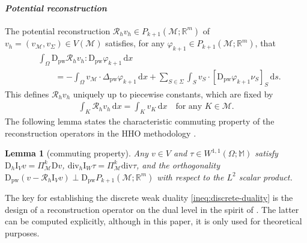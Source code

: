 \documentclass[a4paper]{amsart}
\numberwithin{equation}{section}
\newcommand{\R}{\mathbb{R}}
\renewcommand{\d}[1]{\,\mathrm{d}#1}
\renewcommand{\div}{\mathrm{div}}
\newcommand{\I}{\mathrm{I}}
\newcommand{\Mcal}{\mathcal{M}}
\newcommand{\pw}{\mathrm{pw}}
\newcommand{\D}{\mathrm{D}}
\newcommand{\M}{\mathbb{M}}
\newtheorem{lemma}[theorem]{Lemma}
\theoremstyle{remark}
\begin{document}
\paragraph{\emph{Potential reconstruction}}
The potential reconstruction $\mathcal{R}_h v_h \in P_{k+1}(\Mcal;\R^m)$ of $v_h = (v_\Mcal, v_\Sigma) \in V(\Mcal)$ satisfies, for any $\varphi_{k+1} \in P_{k+1}(\Mcal; \R^m)$, that
\begin{align}\label{def:pot-rec-1}
	&\int_\Omega \D_\pw \mathcal{R}_h v_h : \D_\pw \varphi_{k+1} \d{x}\nonumber\\
	&\qquad = - \int_\Omega v_\Mcal \cdot \Delta_\pw \varphi_{k+1} \d{x} + \sum_{S \in \Sigma} \int_S v_S \cdot [\D_\pw \varphi_{k+1} \nu_S]_S \d{s}.
\end{align}
This defines $\mathcal{R}_h v_h$ uniquely up to piecewise constants, which are fixed by
\begin{align}\label{def:pot-rec-2}
	\int_K \mathcal{R}_h v_h \d{x} = \int_K v_K \d{x} \quad\text{for any } K \in \Mcal.
\end{align}
The following lemma states the characteristic commuting property of the reconstruction operators in the HHO methodology \cite{DiPietroErnLemaire2014,DiPietroErn2015,DiPietroDroniou2020}.
\begin{lemma}[commuting property]\label{lem:commuting-property}
	Any $v \in V$ and $\tau \in W^{1,1}(\Omega;\M)$ satisfy $\D_h \I_{V} v = \Pi_\Mcal^k \D v$, $\div_h \I_W \tau = \Pi_\Mcal^k \div \tau$, and the orthogonality $\D_\pw(v - \mathcal{R}_h \I_V v) \perp \D_\pw P_{k+1}(\Mcal;\R^m)$ with respect to the $L^2$ scalar product.
\end{lemma}
The key for establishing the discrete weak duality \eqref{ineq:discrete-duality} is the design of a reconstruction operator on the dual level in the spirit of \cite{DiPietroDroniouRapetti2020,DiPietroDroniou2023}.
The latter can be computed explicitly, although in this paper, it is only used for theoretical purposes.\\[-0.8em]
\end{document}
